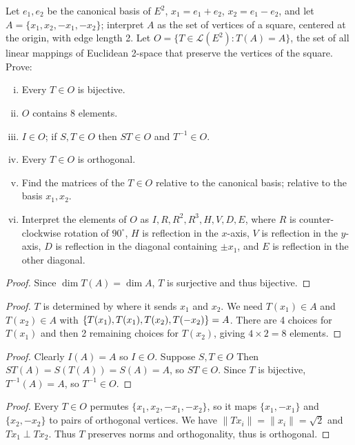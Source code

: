 \begin{tcolorbox}[title=Problem 12, breakable]
Let $e_1, e_2$ be the canonical basis of $E^2$, $x_1 = e_1 + e_2$, $x_2 = e_1 - e_2$, and let $A = \{x_1, x_2, -x_1, -x_2\}$; interpret $A$ as the set of vertices of a square, centered at the origin, with edge length 2. Let $O = \{T \in \mathcal{L}(E^2) : T(A) = A\}$, the set of all linear mappings of Euclidean 2-space that preserve the vertices of the square. Prove:
\begin{enumerate}[(i)]
    \item Every $T \in O$ is bijective.
    \item $O$ contains 8 elements.
    \item $I \in O$; if $S, T \in O$ then $ST \in O$ and $T^{-1} \in O$.
    \item Every $T \in O$ is orthogonal.
    \item Find the matrices of the $T \in O$ relative to the canonical basis; relative to the basis $x_1, x_2$.
    \item Interpret the elements of $O$ as $I, R, R^2, R^3, H, V, D, E$, where $R$ is counter-clockwise rotation of $90^\circ$, $H$ is reflection in the $x$-axis, $V$ is reflection in the $y$-axis, $D$ is reflection in the diagonal containing $\pm x_1$, and $E$ is reflection in the other diagonal.
\end{enumerate}
\end{tcolorbox}

\begin{proof}
    Since $\dim T(A) = \dim A$, $T$ is surjective and thus bijective.
\end{proof}

\begin{proof}
    $T$ is determined by where it sends $x_1$ and $x_2$. We need $T(x_1) \in A$ and $T(x_2) \in A$ with $\{T(x_1), T(\-x_1), T(x_2), T(-x_2)\} = A$. There are 4 choices for $T(x_1)$ and then 2 remaining choices for $T(x_2)$, giving $4 \times 2 = 8$ elements.
\end{proof}

\begin{proof}
    Clearly $I(A) = A$ so $I \in O$. 
    Suppose $S, T \in O$
    Then $ST(A) = S(T(A)) = S(A) = A$, so $ST \in O$. 
    Since $T$ is bijective, $T^{-1}(A) = A$, so $T^{-1} \in O$.
\end{proof}

\begin{proof}
    Every $T \in O$ permutes $\{x_1, x_2, -x_1, -x_2\}$, 
    so it maps $\{x_1, -x_1\}$ and $\{x_2, -x_2\}$ 
    to pairs of orthogonal vertices. 
    We have $\|Tx_i\| = \|x_i\| = \sqrt{2}$ 
        and $Tx_1 \perp Tx_2$. 
    Thus $T$ preserves norms and orthogonality, thus is orthogonal.
\end{proof}

